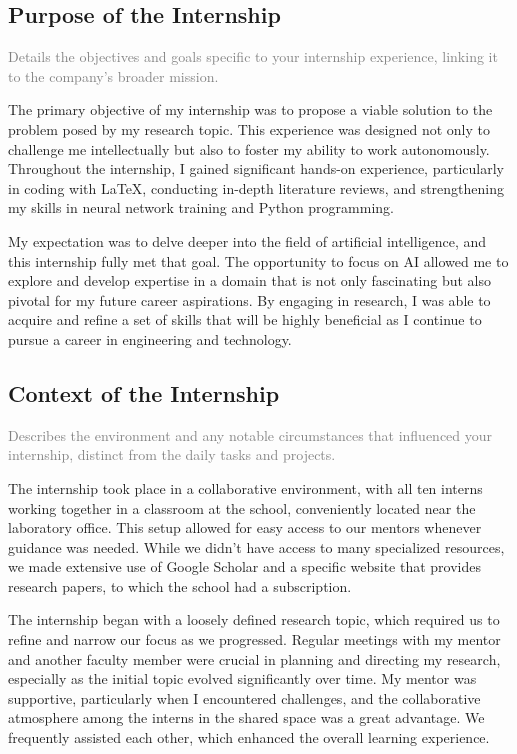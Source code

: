 \subsection{Purpose of the Internship}\label{subsec:purpose-of-the-internship}
\textcolor{gray}
{Details the objectives and goals specific to your internship experience, linking it to the company's broader mission.}

The primary objective of my internship was to propose a viable solution to the problem posed by my research topic.
This experience was designed not only to challenge me intellectually but also to foster my ability to work autonomously.
Throughout the internship, I gained significant hands-on experience, particularly in coding with \LaTeX{}, conducting
in-depth literature reviews, and strengthening my skills in neural network training and Python programming.

My expectation was to delve deeper into the field of artificial intelligence, and this internship fully met that goal.
The opportunity to focus on AI allowed me to explore and develop expertise in a domain that is not only fascinating but
also pivotal for my future career aspirations.
By engaging in research, I was able to acquire and refine a set of skills that will be highly beneficial as I continue
to pursue a career in engineering and technology.

\subsection{Context of the Internship}\label{subsec:context-of-the-internship}
\textcolor{gray}
{Describes the environment and any notable circumstances that influenced your internship, distinct from the daily tasks
and projects.}

The internship took place in a collaborative environment, with all ten interns working together in a classroom at the
school, conveniently located near the laboratory office.
This setup allowed for easy access to our mentors whenever guidance was needed.
While we didn't have access to many specialized resources, we made extensive use of Google Scholar and a specific
website that provides research papers, to which the school had a subscription.

The internship began with a loosely defined research topic, which required us to refine and narrow our focus as we
progressed.
Regular meetings with my mentor and another faculty member were crucial in planning and directing my research,
especially as the initial topic evolved significantly over time.
My mentor was supportive, particularly when I encountered challenges, and the collaborative atmosphere among the interns
in the shared space was a great advantage.
We frequently assisted each other, which enhanced the overall learning experience.

